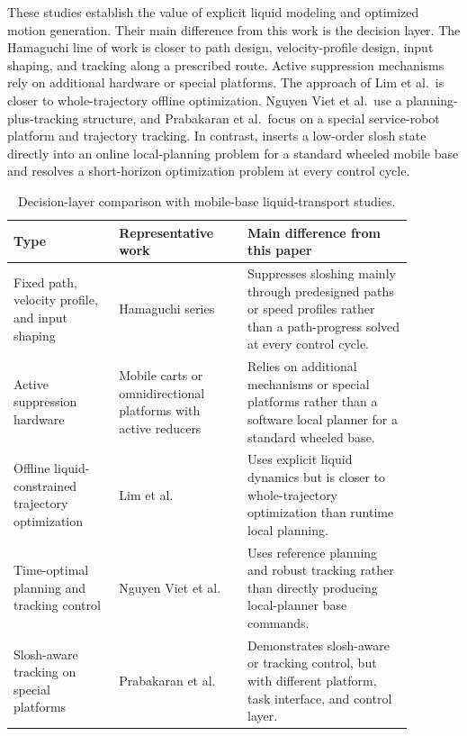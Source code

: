 These studies establish the value of explicit liquid modeling and optimized motion generation.
Their main difference from this work is the decision layer.
The Hamaguchi line of work is closer to path design, velocity-profile design, input shaping, and tracking along a prescribed route.
Active suppression mechanisms rely on additional hardware or special platforms.
The approach of Lim et al.\ is closer to whole-trajectory offline optimization.
Nguyen Viet et al.\ use a planning-plus-tracking structure, and Prabakaran et al.\ focus on a special service-robot platform and trajectory tracking.
In contrast, \SMPCC{} inserts a low-order slosh state directly into an online \MPCC{} local-planning problem for a standard wheeled mobile base and resolves a short-horizon optimization problem at every control cycle.

\begin{table}[t]
  \centering
  \scriptsize
  \setlength{\tabcolsep}{3pt}
  \caption{Decision-layer comparison with mobile-base liquid-transport studies.}
  \label{tab:mobile_base_related_work_framework}
  \begin{tabular}{p{0.23\linewidth} p{0.29\linewidth} p{0.36\linewidth}}
    \toprule
    Type & Representative work & Main difference from this paper \\
    \midrule
    Fixed path, velocity profile, and input shaping & Hamaguchi series \cite{B04_Hamaguchi2002,B03_Hamaguchi2004,B02_Hamaguchi2005} & Suppresses sloshing mainly through predesigned paths or speed profiles rather than a path-progress \MPCC{} solved at every control cycle. \\
    Active suppression hardware & Mobile carts or omnidirectional platforms with active reducers \cite{B05_Hamaguchi2019,B06_Hamaguchi2018} & Relies on additional mechanisms or special platforms rather than a software local planner for a standard wheeled base. \\
    Offline liquid-constrained trajectory optimization & Lim et al. \cite{B01_Lim2024} & Uses explicit liquid dynamics but is closer to whole-trajectory optimization than runtime local planning. \\
    Time-optimal planning and tracking control & Nguyen Viet et al. \cite{B11_Viet2025} & Uses reference planning and robust tracking rather than directly producing local-planner base commands. \\
    Slosh-aware tracking on special platforms & Prabakaran et al. \cite{B12_Prabakaran2026} & Demonstrates slosh-aware \MPC{} or tracking control, but with different platform, task interface, and control layer. \\
    \bottomrule
  \end{tabular}
\end{table}

